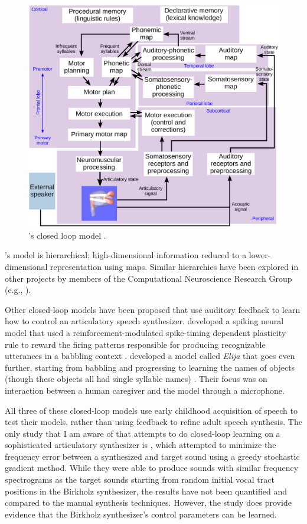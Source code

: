 \documentclass{article}
\begin{document}
\begin{figure}
  \begin{center}
    \includegraphics[width=0.8\linewidth]{kroger}
  \end{center}
  \caption{\citeauthor{kroger2009}'s closed loop model
    \citep{kroger2009}.}
  \label{fig:kroger}
\end{figure}

\citeauthor{kroger2009}'s model
is hierarchical; high-dimensional information
reduced to a lower-dimensional representation
using maps.
Similar hierarchies have been explored
in other projects by members of the
Computational Neuroscience Research Group
(e.g., \citealp{eliasmith2012,dewolf2011}).

Other closed-loop models
have been proposed
that use auditory feedback
to learn how to control
an articulatory speech synthesizer.
\citeauthor{warlaumont2012}
developed a spiking neural model
that used a reinforcement-modulated
spike-timing dependent plasticity rule
to reward the firing patterns
responsible for producing
recognizable utterances
in a babbling context
\citep{warlaumont2012,warlaumont2013}.
\citeauthor{howard2011} developed
a model called \textit{Elija}
that goes even further,
starting from babbling
and progressing to learning
the names of objects
(though these objects all had
single syllable names) \citep{howard2011}.
Their focus was on interaction
between a human caregiver
and the model through a microphone.

All three of these closed-loop models
use early childhood acquisition of speech
to test their models,
rather than using feedback
to refine adult speech synthesis.
The only study that I am aware of
that attempts to do closed-loop learning
on a sophisticated articulatory synthesizer
is \citet{prom2013}, which attempted
to minimize the frequency error
between a synthesized and target sound
using a greedy stochastic gradient method.
While they were able to produce
sounds with similar frequency spectrograms
as the target sounds starting from
random initial vocal tract positions
in the Birkholz synthesizer,
the results have not been quantified
and compared to the manual
synthesis techniques.
However, the study does provide
evidence that the Birkholz synthesizer's
control parameters can be learned.
\end{document}
